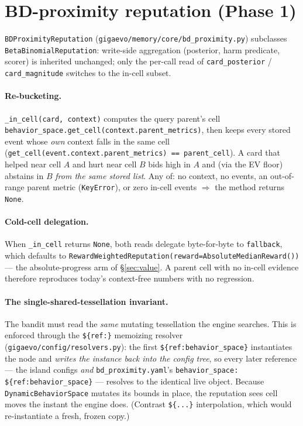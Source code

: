 \documentclass[11pt]{article}
\newcommand{\code}[1]{\texttt{#1}}
\begin{document}
\section{BD-proximity reputation (Phase 1)}
\label{sec:bd}

\code{BDProximityReputation} (\code{gigaevo/memory/core/bd\_proximity.py})
subclasses \code{BetaBinomialReputation}: write-side aggregation (posterior, harm
predicate, scorer) is inherited unchanged; only the per-call read of
\code{card\_posterior} / \code{card\_magnitude} switches to the in-cell subset.

\paragraph{Re-bucketing.} \code{\_in\_cell(card, context)} computes the query
parent's cell \code{behavior\_space.get\_cell(context.parent\_metrics)}, then
keeps every stored event whose \emph{own} context falls in the same cell
(\code{get\_cell(event.context.parent\_metrics) == parent\_cell}). A card that
helped near cell $A$ and hurt near cell $B$ bids high in $A$ and (via the EV
floor) abstains in $B$ \emph{from the same stored list}. Any of: no context, no
events, an out-of-range parent metric (\code{KeyError}), or zero in-cell events
$\Rightarrow$ the method returns \code{None}.

\paragraph{Cold-cell delegation.} When \code{\_in\_cell} returns \code{None}, both
reads delegate byte-for-byte to \code{fallback}, which defaults to
\code{RewardWeightedReputation(reward=AbsoluteMedianReward())} --- the
absolute-progress arm of \S\ref{sec:value}. A parent cell with no in-cell evidence
therefore reproduces today's context-free numbers with no regression.

\paragraph{The single-shared-tessellation invariant.} The bandit must read the
\emph{same} mutating tessellation the engine searches. This is enforced through
the \code{\$\{ref:\}} memoizing resolver (\code{gigaevo/config/resolvers.py}):
the first \code{\$\{ref:behavior\_space\}} instantiates the node and \emph{writes
the instance back into the config tree}, so every later reference --- the island
configs \emph{and} \code{bd\_proximity.yaml}'s
\code{behavior\_space: \$\{ref:behavior\_space\}} --- resolves to the identical
live object. Because \code{DynamicBehaviorSpace} mutates its bounds in place, the
reputation sees cell moves the instant the engine does. (Contrast \code{\$\{...\}}
interpolation, which would re-instantiate a fresh, frozen copy.)
\end{document}
